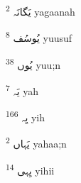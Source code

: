 \documentclass[12pt]{article}
\begin{document}
\begin{RTL}
\begin{multicols}{5}
{\ur یَگانَہ}   \textsuperscript{2} yagaanah

{\ur یُوسُف}   \textsuperscript{8} yuusuf

{\ur یُوں}   \textsuperscript{38} yuu;n

{\ur یَہ}   \textsuperscript{7} yah

{\ur یِہ}   \textsuperscript{166} yih

{\ur یَہاں}   \textsuperscript{2} yahaa;n

{\ur یِہی}   \textsuperscript{14} yihii



 

\end{multicols}
\end{RTL}
\end{document}
